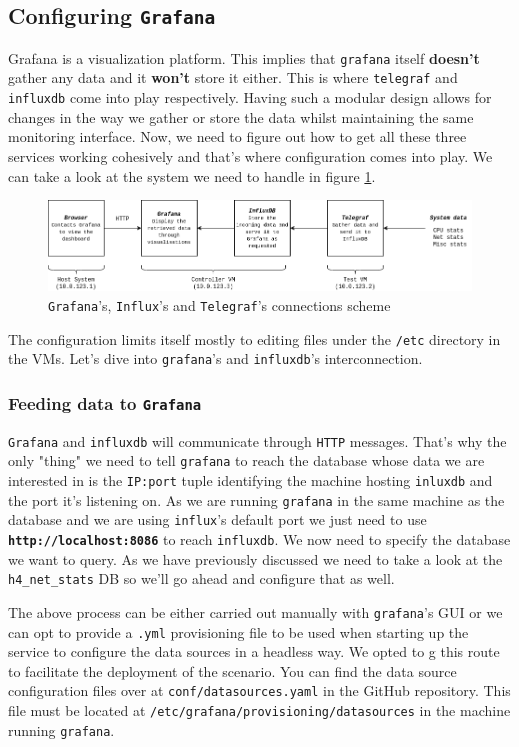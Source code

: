 \documentclass[12pt]{article}
\newcommand{\newpar} {
    \vskip 1cm
}
\begin{document}
	\subsection{Configuring \texttt{Grafana}}
		Grafana is a visualization platform. This implies that \texttt{grafana} itself \textbf{doesn't} gather any data and it \textbf{won't} store it either. This is where \texttt{telegraf} and \texttt{influxdb} come into play respectively. Having such a modular design allows for changes in the way we gather or store the data whilst maintaining the same monitoring interface. Now, we need to figure out how to get all these three services working cohesively and that's where configuration comes into play. We can take a look at the system we need to handle in figure \ref{f:g_i_t}.

		\begin{figure}
			\centering
			\includegraphics[width=\linewidth]{g_i_t.png}
			\caption{\texttt{Grafana}'s, \texttt{Influx}'s and \texttt{Telegraf}'s connections scheme}
			\label{f:g_i_t}
		\end{figure}

		The configuration limits itself mostly to editing files under the \texttt{/etc} directory in the VMs. Let's dive into \texttt{grafana}'s and \texttt{influxdb}'s interconnection.

		\subsubsection{Feeding data to \texttt{Grafana}}
			\texttt{Grafana} and \texttt{influxdb} will communicate through \texttt{HTTP} messages. That's why the only "thing" we need to tell \texttt{grafana} to reach the database whose data we are interested in is the \texttt{IP:port} tuple identifying the machine hosting \texttt{inluxdb} and the port it's listening on. As we are running \texttt{grafana} in the same machine as the database and we are using \texttt{influx}'s default port we just need to use \textbf{\texttt{http://localhost:8086}} to reach \texttt{influxdb}. We now need to specify the database we want to query. As we have previously discussed we need to take a look at the \texttt{h4_net_stats} DB so we'll go ahead and configure that as well.
			\newpar
			The above process can be either carried out manually with \texttt{grafana}'s GUI or we can opt to provide a \texttt{.yml} provisioning file to be used when starting up the service to configure the data sources in a headless way. We opted to g this route to facilitate the deployment of the scenario. You can find the data source configuration files over at \texttt{conf/datasources.yaml} in the GitHub repository. This file must be located at \texttt{/etc/grafana/provisioning/datasources} in the machine running \texttt{grafana}.
\end{document}
